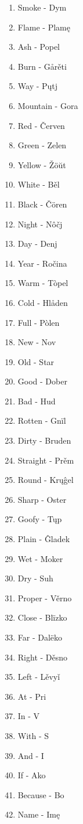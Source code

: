 \begin{multicols}{2}
\begin{enumerate}
	\item Smoke - Dym
	\item Flame - Plamę
	\item Ash - Popel
	\item Burn - Gårěti
	\item Way - Pųtj
	\item Mountain - Gora
	\item Red - Červen
	\item Green - Zelen
	\item Yellow - Žöŭt
	\item White - Běl
	\item Black - Čören
	\item Night - Nôčj
	\item Day - Denj
	\item Year - Ročina
	\item Warm - Tòpel
	\item Cold - Hlåden
	\item Full - Pòlen
	\item New - Nov
	\item Old - Star
	\item Good - Dober 
	\item Bad - Hud
	\item Rotten - Gnïl
	\item Dirty - Bruden
	\item Straight - Prěm
	\item Round - Krųĝel
	\item Sharp - Oster
	\item Goofy - Tųp
	\item Plain - Ĝladek
	\item Wet - Moker
	\item Dry - Suh
	\item Proper - Věrno
	\item Close - Blïzko
	\item Far - Dalëko
	\item Right - Děsno
	\item Left - Lěvyǐ
	\item At - Pri
	\item In - V
	\item With - S
	\item And - I
	\item If - Ako
	\item Because - Bo
	\item Name - Imę
\end{enumerate}
\end{multicols}